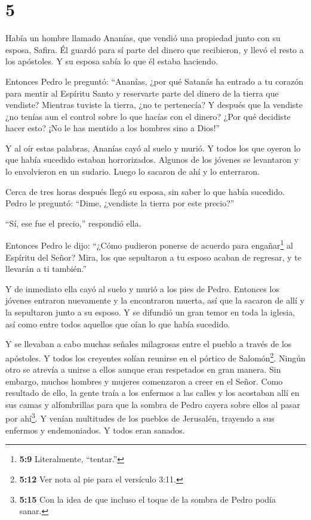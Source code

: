 \hypertarget{section-4}{%
\section{5}\label{section-4}}

 Había un hombre llamado Ananías, que vendió una propiedad
junto con su esposa, Safira.  Él guardó para sí parte del
dinero que recibieron, y llevó el resto a los apóstoles. Y su esposa
sabía lo que él estaba haciendo.

 Entonces Pedro le preguntó: ``Ananías, ¿por qué Satanás ha
entrado a tu corazón para mentir al Espíritu Santo y reservarte parte
del dinero de la tierra que vendiste?  Mientras tuviste la
tierra, ¿no te pertenecía? Y después que la vendiste ¿no tenías aun el
control sobre lo que hacías con el dinero? ¿Por qué decidiste hacer
esto? ¡No le has mentido a los hombres sino a Dios!''

 Y al oír estas palabras, Ananías cayó al suelo y murió. Y
todos los que oyeron lo que había sucedido estaban horrorizados.
 Algunos de los jóvenes se levantaron y lo envolvieron en un
sudario. Luego lo sacaron de ahí y lo enterraron.

 Cerca de tres horas después llegó su esposa, sin saber lo
que había sucedido.  Pedro le preguntó: ``Dime, ¿vendiste la
tierra por este precio?''

``Sí, ese fue el precio,'' respondió ella.

 Entonces Pedro le dijo: ``¿Cómo pudieron ponerse de acuerdo
para engañar\footnote{\textbf{5:9} Literalmente, ``tentar.''} al
Espíritu del Señor? Mira, los que sepultaron a tu esposo acaban de
regresar, y te llevarán a ti también.''

 Y de inmediato ella cayó al suelo y murió a los pies de
Pedro. Entonces los jóvenes entraron nuevamente y la encontraron muerta,
así que la sacaron de allí y la sepultaron junto a su esposo.
 Y se difundió un gran temor en toda la iglesia, así como
entre todos aquellos que oían lo que había sucedido.

 Y se llevaban a cabo muchas señales milagrosas entre el
pueblo a través de los apóstoles. Y todos los creyentes solían reunirse
en el pórtico de Salomón\footnote{\textbf{5:12} Ver nota al pie para el
  versículo 3:11.}.  Ningún otro se atrevía a unirse a
ellos aunque eran respetados en gran manera.  Sin embargo,
muchos hombres y mujeres comenzaron a creer en el Señor. 
Como resultado de ello, la gente traía a los enfermos a las calles y los
acostaban allí en sus camas y alfombrillas para que la sombra de Pedro
cayera sobre ellos al pasar por ahí\footnote{\textbf{5:15} Con la idea
  de que incluso el toque de la sombra de Pedro podía sanar.}.
 Y venían multitudes de los pueblos de Jerusalén, trayendo
a sus enfermos y endemoniados. Y todos eran sanados.

